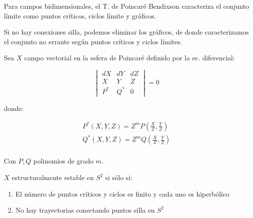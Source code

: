 \begin{thm}
	
\end{thm}

\begin{rmrk}
	Para campos bidimensionales, el T. de Poincaré Bendixson caracteriza el conjunto límite como puntos críticos, ciclos límite y gráficos. 
	
	Si no hay conexiones silla, podemos eliminar los gráficos, de donde caracterizamos el conjunto no errante según puntos críticos y ciclos límites.
\end{rmrk}

\begin{defn}
	
\end{defn}

\begin{thm}
	
\end{thm}

\begin{cor}
	Sea $X$ campo vectorial en la esfera de Poincaré definido por la ec. diferencial:
	
	\begin{equation*}
		\begin{vmatrix}
			dX & dY & dZ\\
			X & Y & Z\\
			P^* & Q^* & 0
		\end{vmatrix} = 0
	\end{equation*}
	
	donde:
	
	\begin{align*}
		P^*(X,Y,Z) = Z^m P(\frac{X}{Z},\frac{Y}{Z})\\
		Q^*(X,Y,Z) = Z^m Q(\frac{X}{Z},\frac{Y}{Z})\\
	\end{align*}
	
	Con $P,Q$ polinomios de grado $m$. 
	
	$X$ estructuralmente estable en $S^2$ si sólo si:
	
	\begin{enumerate}
		\item El número de puntos críticos y ciclos es finito y cada uno es hiperbólico
		
		\item No hay trayectorias conectando puntos silla en $S^2$
	\end{enumerate}
\end{cor}

